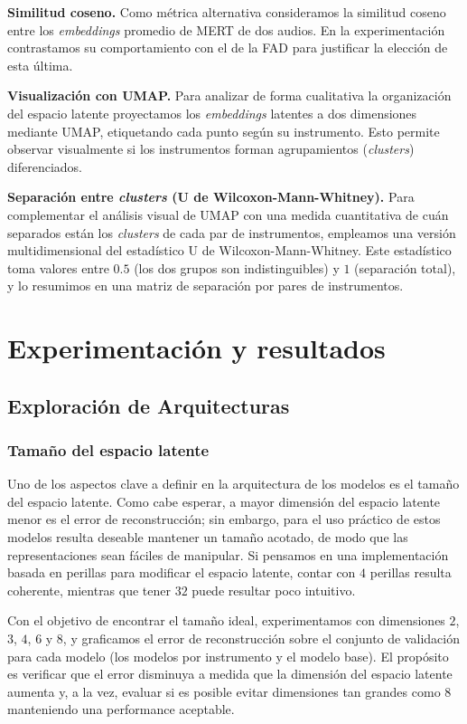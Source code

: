 \documentclass[12pt,a4paper,twoside]{tesis}
\begin{document}
\textbf{Similitud coseno.} Como métrica alternativa consideramos la similitud coseno entre los \textit{embeddings} promedio de MERT de dos audios. En la experimentación contrastamos su comportamiento con el de la FAD para justificar la elección de esta última.

\textbf{Visualización con UMAP.} Para analizar de forma cualitativa la organización del espacio latente proyectamos los \textit{embeddings} latentes a dos dimensiones mediante UMAP, etiquetando cada punto según su instrumento. Esto permite observar visualmente si los instrumentos forman agrupamientos (\textit{clusters}) diferenciados.

\textbf{Separación entre \textit{clusters} (U de Wilcoxon-Mann-Whitney).} Para complementar el análisis visual de UMAP con una medida cuantitativa de cuán separados están los \textit{clusters} de cada par de instrumentos, empleamos una versión multidimensional del estadístico U de Wilcoxon-Mann-Whitney. Este estadístico toma valores entre $0.5$ (los dos grupos son indistinguibles) y $1$ (separación total), y lo resumimos en una matriz de separación por pares de instrumentos.


\chapter{Experimentación y resultados}
\label{cap:experimentacion}

\section{Exploración de Arquitecturas}

\subsection{Tamaño del espacio latente}

Uno de los aspectos clave a definir en la arquitectura de los modelos es el tamaño del espacio latente. Como cabe esperar, a mayor dimensión del espacio latente menor es el error de reconstrucción; sin embargo, para el uso práctico de estos modelos resulta deseable mantener un tamaño acotado, de modo que las representaciones sean fáciles de manipular. Si pensamos en una implementación basada en perillas para modificar el espacio latente, contar con $4$ perillas resulta coherente, mientras que tener $32$ puede resultar poco intuitivo.

Con el objetivo de encontrar el tamaño ideal, experimentamos con dimensiones $2$, $3$, $4$, $6$ y $8$, y graficamos el error de reconstrucción sobre el conjunto de validación para cada modelo (los modelos por instrumento y el modelo base). El propósito es verificar que el error disminuya a medida que la dimensión del espacio latente aumenta y, a la vez, evaluar si es posible evitar dimensiones tan grandes como $8$ manteniendo una performance aceptable.
\end{document}
